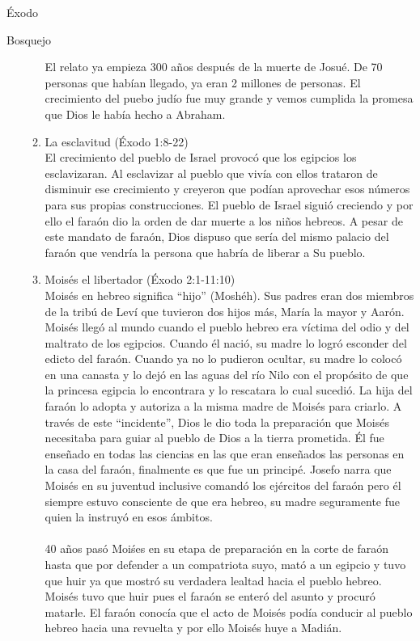 \begin{section}{Éxodo}
\begin{subsection}{Bosquejo}
\begin{enumerate}
\begin{enumerate}
					El relato ya empieza 300 años después de la muerte de Josué. De 70 personas que habían llegado, ya eran 2 millones de personas. El crecimiento del puebo judío fue muy grande y vemos cumplida la promesa que Dios le había hecho a Abraham.\newpage
					\item La esclavitud (Éxodo 1:8-22)\\
					El crecimiento del pueblo de Israel provocó que los egipcios los esclavizaran. Al esclavizar al pueblo que vivía con ellos trataron de disminuir ese crecimiento y creyeron que podían aprovechar esos números para sus propias construcciones. El pueblo de Israel siguió creciendo y por ello el faraón dio la orden de dar muerte a los niños hebreos. A pesar de este mandato de faraón, Dios dispuso que sería del mismo palacio del faraón que vendría la persona que habría de liberar a Su pueblo. 
					\item Moisés el libertador (Éxodo 2:1-11:10)\\
						Moisés en hebreo significa ``hijo'' (Moshéh). Sus padres eran dos miembros de la tribú de Leví que tuvieron dos hijos más, María la mayor y Aarón. Moisés llegó al mundo cuando el pueblo hebreo era víctima del odio y del maltrato de los egipcios. Cuando él nació, su madre lo logró esconder del edicto del faraón. Cuando ya no lo pudieron ocultar, su madre lo colocó en una canasta y lo dejó en las aguas del río Nilo con el propósito de que la princesa egipcia lo encontrara y lo rescatara lo cual sucedió. La hija del faraón lo adopta y autoriza a la misma madre de Moisés para criarlo. A través de este ``incidente'', Dios le dio toda la preparación que Moisés necesitaba para guiar al pueblo de Dios a la tierra prometida. Él fue enseñado en todas las ciencias en las que eran enseñados las personas en la casa del faraón, finalmente es que fue un principé. Josefo narra que Moisés en su juventud inclusive comandó los ejércitos del faraón pero él siempre estuvo consciente de que era hebreo, su madre seguramente fue quien la instruyó en esos ámbitos. \\~\\
						40 años pasó Moiśes en su etapa de preparación en la corte de faraón hasta que por defender a un compatriota suyo, mató a un egipcio y tuvo que huir ya que mostró su verdadera lealtad hacia el pueblo hebreo. Moisés tuvo que huir pues el faraón se enteró del asunto y procuró matarle. El faraón conocía que el acto de Moisés podía conducir al pueblo hebreo hacia una revuelta y por ello Moisés huye a Madián.\\

\end{enumerate}
\end{enumerate}
\end{subsection}
\end{section}
